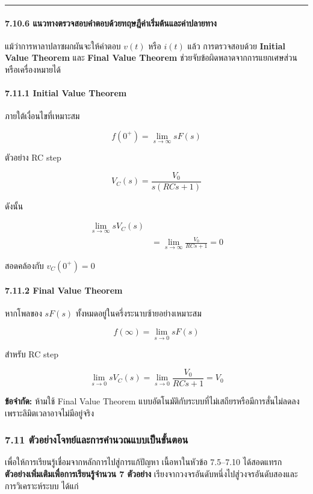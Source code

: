 \par\noindent\rule{\textwidth}{0.4pt}\par

\paragraph{7.10.6 แนวทางตรวจสอบคำตอบด้วยทฤษฎีค่าเริ่มต้นและค่าปลายทาง}

แม้ว่าการหาลาปลาซผกผันจะให้คำตอบ $v(t)$ หรือ $i(t)$ แล้ว การตรวจสอบด้วย \textbf{Initial Value Theorem} และ \textbf{Final Value Theorem} ช่วยจับข้อผิดพลาดจากการแยกเศษส่วนหรือเครื่องหมายได้

\paragraph{7.11.1 Initial Value Theorem}

ภายใต้เงื่อนไขที่เหมาะสม

\[
\boxed{f(0^+)=\lim_{s\to\infty}sF(s)}
\]

ตัวอย่าง RC step

\[
V_C(s)=\frac{V_0}{s(RCs+1)}
\]

ดังนั้น

\[
\begin{aligned}
    \lim_{s\to\infty}sV_C(s) \\
    &=\lim_{s\to\infty}\frac{V_0}{RCs+1}=0
\end{aligned}
\]

สอดคล้องกับ $v_C(0^+)=0$

\paragraph{7.11.2 Final Value Theorem}

หากโพลของ $sF(s)$ ทั้งหมดอยู่ในครึ่งระนาบซ้ายอย่างเหมาะสม

\[
\boxed{f(\infty)=\lim_{s\to0}sF(s)}
\]

สำหรับ RC step

\[
\lim_{s\to0}sV_C(s)=\lim_{s\to0}\frac{V_0}{RCs+1}=V_0
\]

\textbf{ข้อจำกัด:} ห้ามใช้ Final Value Theorem แบบอัตโนมัติกับระบบที่ไม่เสถียรหรือมีการสั่นไม่ลดลง เพราะลิมิตเวลาอาจไม่มีอยู่จริง

\subsubsection{7.11 ตัวอย่างโจทย์และการคำนวณแบบเป็นขั้นตอน}

เพื่อให้การเรียนรู้เชื่อมจากหลักการไปสู่การแก้ปัญหา เนื้อหาในหัวข้อ 7.5–7.10 ได้สอดแทรก \textbf{ตัวอย่างเพิ่มเติมเพื่อการเรียนรู้จำนวน 7 ตัวอย่าง} เรียงจากวงจรอันดับหนึ่งไปสู่วงจรอันดับสองและการวิเคราะห์ระบบ ได้แก่

